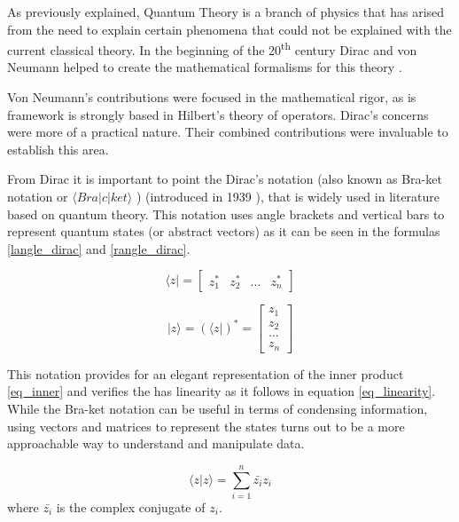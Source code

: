 As previously explained, Quantum Theory is a branch of physics that has arised from the need to explain certain phenomena that could not be explained with the current classical theory.
In the beginning of the 20\textsuperscript{th} century Dirac and von Neumann  helped to create the mathematical formalisms for this theory \cite{sep-qt-nvd}\cite{Summers2006}. 

Von Neumann's contributions were focused in the mathematical rigor, as is framework is strongly based in Hilbert's theory of operators. Dirac's concerns were more of a practical nature. Their combined contributions were invaluable to establish this area. 

From Dirac it is important to point the Dirac's notation (also known as Bra-ket notation or  $\langle Bra\vert c\vert ket\rangle$ ) (introduced in 1939 \cite{sep-qt-nvd}), that is widely used in literature based on quantum theory. This notation uses angle brackets and vertical bars to represent quantum states (or abstract vectors) as it can be seen in the formulas \eqref{langle_dirac} and \eqref{rangle_dirac}. 

\begin{equation}
\label{langle_dirac}
\langle z\vert=\left[\begin{array}{cccc}
z_{1}^{*} & z_{2}^{*} & ... & z_{n}^{*}\end{array}\right]
\end{equation}

\begin{equation}
\label{rangle_dirac}
\vert z\rangle = ( \langle z\vert )^*  =\left[\begin{array}{c}
z_{1}\\
z_{2}\\
...\\
z_{n}
\end{array}\right]
\end{equation}


This notation provides for an elegant representation of the inner product \eqref{eq_inner} and verifies the has linearity as it follows in equation \eqref{eq_linearity}. While the Bra-ket notation can be useful in terms of condensing information, using vectors and matrices to represent the states turns out to be a more approachable way to understand and manipulate data.
 

\begin{equation}
\label{eq_inner}
\langle z\vert z\rangle={\displaystyle \sum_{i=1}^{n}\bar{z_{i}}z_{i}}
\end{equation}
where $\bar{z_{i}}$ is the complex conjugate of $z_{i}$.

